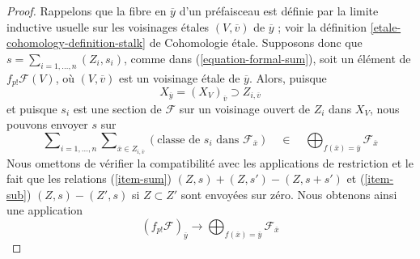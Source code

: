\begin{proof}
Rappelons que la fibre en $\overline{y}$ d'un préfaisceau est définie par la
limite inductive usuelle sur les voisinages étales $(V, \overline{v})$
de $\overline{y}$ ; voir la définition
\ref{etale-cohomology-definition-stalk} de Cohomologie étale. Supposons donc que
$s = \sum_{i = 1, \ldots, n} (Z_i, s_i)$, comme dans
(\ref{equation-formal-sum}), soit un élément de $f_{p!}\mathcal{F}(V)$,
où $(V, \overline{v})$ est un voisinage étale de $\overline{y}$.
Alors, puisque
$$
X_{\overline{y}} = (X_V)_{\overline{v}} \supset Z_{i, \overline{v}}
$$
et puisque $s_i$ est une section de $\mathcal{F}$ sur un voisinage ouvert
de $Z_i$ dans $X_V$, nous pouvons envoyer $s$ sur
$$
\sum\nolimits_{i = 1, \ldots, n} 
\sum\nolimits_{\overline{x} \in Z_{i, \overline{v}}}
\left(\text{classe de }s_i\text{ dans }\mathcal{F}_{\overline{x}}\right)
\quad\in\quad
\bigoplus\nolimits_{f(\overline{x}) = \overline{y}} \mathcal{F}_{\overline{x}}
$$
Nous omettons de vérifier la compatibilité avec les applications de restriction
et le fait que les relations (\ref{item-sum}) $(Z, s) + (Z, s') - (Z, s + s')$
et (\ref{item-sub}) $(Z, s) - (Z', s)$ si $Z \subset Z'$ sont envoyées sur zéro.
Nous obtenons ainsi une application
$$
(f_{p!}\mathcal{F})_{\overline{y}}
\longrightarrow
\bigoplus\nolimits_{f(\overline{x}) = \overline{y}} \mathcal{F}_{\overline{x}}
$$


\end{proof}
